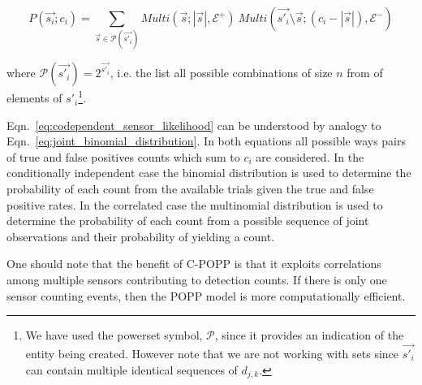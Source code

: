 \begin{equation}
\label{eq:codependent_sensor_likelihood}
P(\vec{s_i} ; c_i) = \sum\limits_{\vec{s} \in \mathcal{P}(\vec{s'_i})} Multi(\vec{s} ; |\vec{s}|, \mathcal E^+) ~ Multi(\vec{s'_i}\setminus \vec{s} ; (c_i - |\vec{s}|), \mathcal E^-)
\end{equation}

\noindent where $\mathcal{P}(\vec{s'_i}) = 2^{\vec{s'_i}}$, i.e. the list all possible combinations of size $n$ from of elements of $s'_i$\footnote{We have used the powerset symbol, $\mathcal{P}$, since it provides an indication of the entity being created. However note that we are not working with sets since $\vec{s'_i}$ can contain multiple identical sequences of $d_{j,k}$.}. 


Eqn.~\ref{eq:codependent_sensor_likelihood} can be understood by analogy to Eqn.~\ref{eq:joint_binomial_distribution}. In both equations all possible ways pairs of true and false positives counts which sum to $c_i$ are considered. In the conditionally independent case the binomial distribution is used to determine the probability of each count from the available trials given the true and false positive rates. In the correlated case the multinomial distribution is used to determine the probability of each count from a possible sequence of joint observations and their probability of yielding a count.

One should note that the benefit of C-POPP is that it exploits correlations among multiple sensors contributing to detection counts. If there is only one sensor counting events, then the POPP model is more computationally efficient.
